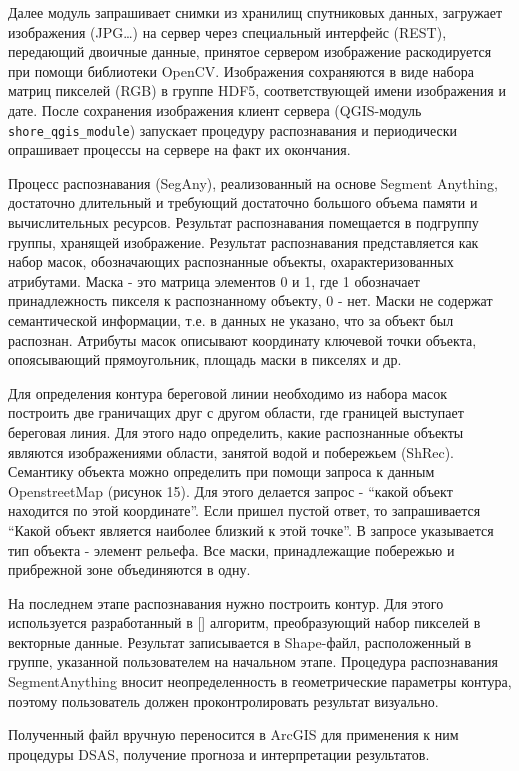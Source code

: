 \documentclass[732,14pt,final]{studrep}
\begin{document}
Далее модуль запрашивает снимки из хранилищ спутниковых данных, загружает изображения (JPG…) на сервер через специальный интерфейс (REST), передающий двоичные данные, принятое сервером изображение раскодируется при помощи библиотеки OpenCV. Изображения сохраняются в виде набора матриц пикселей (RGB) в группе HDF5, соответствующей имени изображения и дате. После сохранения изображения клиент сервера (QGIS-модуль \verb|shore_qgis_module|) запускает процедуру распознавания и периодически опрашивает процессы на сервере на факт их окончания.

Процесс распознавания (SegAny), реализованный на основе Segment Anything, достаточно длительный и требующий достаточно большого объема памяти и вычислительных ресурсов. Результат распознавания помещается в подгруппу группы, хранящей изображение. Результат распознавания представляется как набор масок, обозначающих распознанные объекты, охарактеризованных атрибутами. Маска - это матрица элементов 0 и 1, где 1 обозначает принадлежность пикселя к распознанному объекту, 0 - нет. Маски не содержат семантической информации, т.е. в данных не указано, что за объект был распознан. Атрибуты масок описывают координату ключевой точки объекта, опоясывающий прямоугольник, площадь маски в пикселях и др.

Для определения контура береговой линии необходимо из набора масок построить две граничащих друг с другом области, где границей выступает береговая линия. Для этого надо определить, какие распознанные объекты являются изображениями области, занятой водой и побережьем (ShRec). Семантику объекта можно определить при помощи запроса к данным OpenstreetMap (рисунок 15). Для этого делается запрос - “какой объект находится по этой координате”. Если пришел пустой ответ, то запрашивается “Какой объект является наиболее близкий к этой точке”. В запросе указывается тип объекта - элемент рельефа. Все маски, принадлежащие побережью и прибрежной зоне объединяются в одну.

На последнем этапе распознавания нужно построить контур. Для этого используется разработанный в [] алгоритм, преобразующий набор пикселей в векторные данные. Результат записывается в Shape-файл, расположенный в группе, указанной пользователем на начальном этапе. Процедура распознавания SegmentAnything вносит неопределенность в геометрические параметры контура, поэтому пользователь должен проконтролировать результат визуально.

Полученный файл вручную переносится в ArcGIS для применения к ним процедуры DSAS, получение прогноза и интерпретации результатов.
\end{document}
